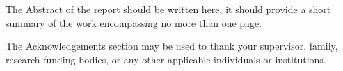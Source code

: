 \beforeabstract
{}
The Abstract of the report should be written here, it should provide a short summary of the work encompassing no more than one page.

The Acknowledgements section may be used to thank your supervisor, family, research funding bodies, or any other applicable individuals or institutions.

\afterpreface \afterabstract
